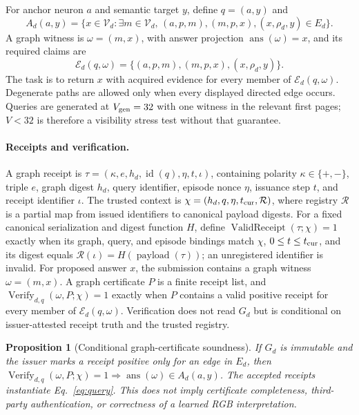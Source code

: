 \documentclass{article}
\newtheorem{proposition}{Proposition}
\begin{document}
For anchor neuron \(a\) and semantic target \(y\), define \(q=(a,y)\) and
\begin{equation}
 A_d(a,y)=\{x\in\mathcal V_d:\exists m\in\mathcal V_d,\,
 (a,p,m),(m,p,x),(x,\rho_d,y)\in E_d\}.
 \label{eq:query}
\end{equation}
A graph witness is \(\omega=(m,x)\), with answer projection
\(\operatorname{ans}(\omega)=x\), and its required claims are
\begin{equation}
 \mathcal E_d(q,\omega)=\{(a,p,m),(m,p,x),(x,\rho_d,y)\}.
 \label{eq:required-claims}
\end{equation}
The task is to return \(x\) with acquired evidence for every member of
\(\mathcal E_d(q,\omega)\). Degenerate paths are allowed only when every displayed directed edge occurs. Queries are generated
at \(V_{\rm gen}=32\) with one witness in the relevant first pages; \(V<32\)
is therefore a visibility stress test without that guarantee.

\paragraph{Receipts and verification.}
A graph receipt is
\(\tau=(\kappa,e,h_d,\operatorname{id}(q),\eta,t,\iota)\), containing polarity
\(\kappa\in\{+,-\}\), triple \(e\), graph digest \(h_d\), query identifier,
episode nonce \(\eta\), issuance step \(t\), and receipt identifier \(\iota\).
The trusted context is
\(\chi=(h_d,q,\eta,t_{\rm cur},\mathcal R)\), where registry \(\mathcal R\)
is a partial map from issued identifiers to canonical payload digests. For a
fixed canonical serialization and digest function $H$, define
\(\operatorname{ValidReceipt}(\tau;\chi)=1\) exactly when its graph, query, and
episode bindings match \(\chi\), \(0\leq t\leq t_{\rm cur}\), and its digest
equals $\mathcal R(\iota)=H(\operatorname{payload}(\tau))$; an unregistered
identifier is invalid. For proposed answer \(x\), the submission contains a graph witness
\(\omega=(m,x)\). A graph certificate \(P\) is a finite receipt list,
and \(\operatorname{Verify}_{d,q}(\omega,P;\chi)=1\) exactly when \(P\)
contains a valid positive receipt for every member of
\(\mathcal E_d(q,\omega)\). Verification does not read $G_d$ but is conditional
on issuer-attested receipt truth and the trusted registry.

\begin{proposition}[Conditional graph-certificate soundness]\label{prop:graph-soundness}
If \(G_d\) is immutable and the issuer marks a receipt positive only for an edge
in \(E_d\), then
\(\operatorname{Verify}_{d,q}(\omega,P;\chi)=1\Rightarrow
\operatorname{ans}(\omega)\in A_d(a,y)\).
The accepted receipts instantiate Eq.~\eqref{eq:query}. This does not imply
certificate completeness, third-party authentication, or correctness of a
learned RGB interpretation.

\end{proposition}
\end{document}
